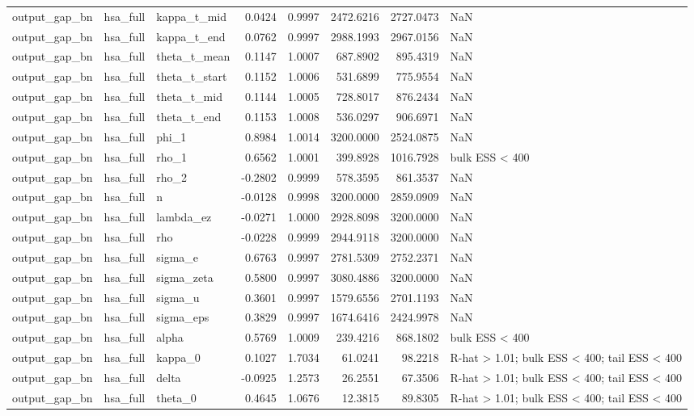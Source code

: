 \begin{tabular}{lllrrrrl}
output\_gap\_bn & hsa\_full & kappa\_t\_mid & 0.0424 & 0.9997 & 2472.6216 & 2727.0473 & NaN \\
output\_gap\_bn & hsa\_full & kappa\_t\_end & 0.0762 & 0.9997 & 2988.1993 & 2967.0156 & NaN \\
output\_gap\_bn & hsa\_full & theta\_t\_mean & 0.1147 & 1.0007 & 687.8902 & 895.4319 & NaN \\
output\_gap\_bn & hsa\_full & theta\_t\_start & 0.1152 & 1.0006 & 531.6899 & 775.9554 & NaN \\
output\_gap\_bn & hsa\_full & theta\_t\_mid & 0.1144 & 1.0005 & 728.8017 & 876.2434 & NaN \\
output\_gap\_bn & hsa\_full & theta\_t\_end & 0.1153 & 1.0008 & 536.0297 & 906.6971 & NaN \\
output\_gap\_bn & hsa\_full & phi\_1 & 0.8984 & 1.0014 & 3200.0000 & 2524.0875 & NaN \\
output\_gap\_bn & hsa\_full & rho\_1 & 0.6562 & 1.0001 & 399.8928 & 1016.7928 & bulk ESS < 400 \\
output\_gap\_bn & hsa\_full & rho\_2 & -0.2802 & 0.9999 & 578.3595 & 861.3537 & NaN \\
output\_gap\_bn & hsa\_full & n & -0.0128 & 0.9998 & 3200.0000 & 2859.0909 & NaN \\
output\_gap\_bn & hsa\_full & lambda\_ez & -0.0271 & 1.0000 & 2928.8098 & 3200.0000 & NaN \\
output\_gap\_bn & hsa\_full & rho & -0.0228 & 0.9999 & 2944.9118 & 3200.0000 & NaN \\
output\_gap\_bn & hsa\_full & sigma\_e & 0.6763 & 0.9997 & 2781.5309 & 2752.2371 & NaN \\
output\_gap\_bn & hsa\_full & sigma\_zeta & 0.5800 & 0.9997 & 3080.4886 & 3200.0000 & NaN \\
output\_gap\_bn & hsa\_full & sigma\_u & 0.3601 & 0.9997 & 1579.6556 & 2701.1193 & NaN \\
output\_gap\_bn & hsa\_full & sigma\_eps & 0.3829 & 0.9997 & 1674.6416 & 2424.9978 & NaN \\
output\_gap\_bn & hsa\_full & alpha & 0.5769 & 1.0009 & 239.4216 & 868.1802 & bulk ESS < 400 \\
output\_gap\_bn & hsa\_full & kappa\_0 & 0.1027 & 1.7034 & 61.0241 & 98.2218 & R-hat > 1.01; bulk ESS < 400; tail ESS < 400 \\
output\_gap\_bn & hsa\_full & delta & -0.0925 & 1.2573 & 26.2551 & 67.3506 & R-hat > 1.01; bulk ESS < 400; tail ESS < 400 \\
output\_gap\_bn & hsa\_full & theta\_0 & 0.4645 & 1.0676 & 12.3815 & 89.8305 & R-hat > 1.01; bulk ESS < 400; tail ESS < 400 \\

\end{tabular}
